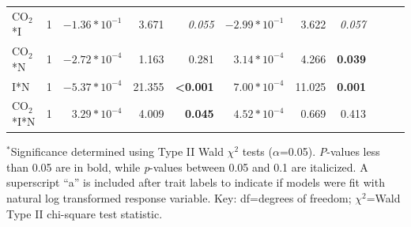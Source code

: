 \begin{landscape}
\begin{table}
{\begin{tabular}{p{3cm}p{0.5cm}p{1.75cm}p{1.5cm}p{1.5cm}p{1.75cm}p{1.5cm}p{1.5cm}p{1.75cm}p{1.5cm}p{1.5cm}}
            CO$_2$*I & \multicolumn{1}{r}{1}
            & \multicolumn{1}{r}{$-1.36*10^{-1}$}     & \multicolumn{1}{r}{3.671}         & \multicolumn{1}{r}{\textit{0.055}}
            & \multicolumn{1}{r}{$-2.99*10^{-1}$}     & \multicolumn{1}{r}{3.622}         & \multicolumn{1}{r}{\textit{0.057}}
            & \multicolumn{1}{r}{}              & \multicolumn{1}{r}{}              & \multicolumn{1}{r}{} 
            \\

            CO$_2$*N & \multicolumn{1}{r}{1}
            & \multicolumn{1}{r}{$-2.72*10^{-4}$}     & \multicolumn{1}{r}{1.163}         & \multicolumn{1}{r}{0.281}
            & \multicolumn{1}{r}{$3.14*10^{-4}$}      & \multicolumn{1}{r}{4.266}         & \multicolumn{1}{r}{\textbf{0.039}}
            & \multicolumn{1}{r}{}              & \multicolumn{1}{r}{}              & \multicolumn{1}{r}{} 
            \\

            I*N & \multicolumn{1}{r}{1}
            & \multicolumn{1}{r}{$-5.37*10^{-4}$}     & \multicolumn{1}{r}{21.355}        & \multicolumn{1}{r}{\textbf{<0.001}}
            & \multicolumn{1}{r}{$7.00*10^{-4}$}      & \multicolumn{1}{r}{11.025}        & \multicolumn{1}{r}{\textbf{0.001}}
            & \multicolumn{1}{r}{}              & \multicolumn{1}{r}{}              & \multicolumn{1}{r}{} 
            \\

            CO$_2$*I*N & \multicolumn{1}{r}{1}
            & \multicolumn{1}{r}{$3.29*10^{-4}$}      & \multicolumn{1}{r}{4.009}         & \multicolumn{1}{r}{\textbf{0.045}}
            & \multicolumn{1}{r}{$4.52*10^{-4}$}      & \multicolumn{1}{r}{0.669}         & \multicolumn{1}{r}{0.413}
            & \multicolumn{1}{r}{}              & \multicolumn{1}{r}{}              & \multicolumn{1}{r}{} 
            \\
            \hline
    \end{tabular}}
    \label{tab:table5.3}
    \end{table}
\begin{singlespace}
    \noindent $^*$Significance determined using Type II Wald $\chi^2$ tests ($\alpha$=0.05). \textit{P}-values less than 0.05 are in bold, while \textit{p}-values between 0.05 and 0.1 are italicized. A superscript “a” is included after trait labels to indicate if models were fit with natural log transformed response variable. Key: df=degrees of freedom; $\chi^2$=Wald Type II chi-square test statistic.
\end{singlespace}
\end{landscape}
\clearpage

